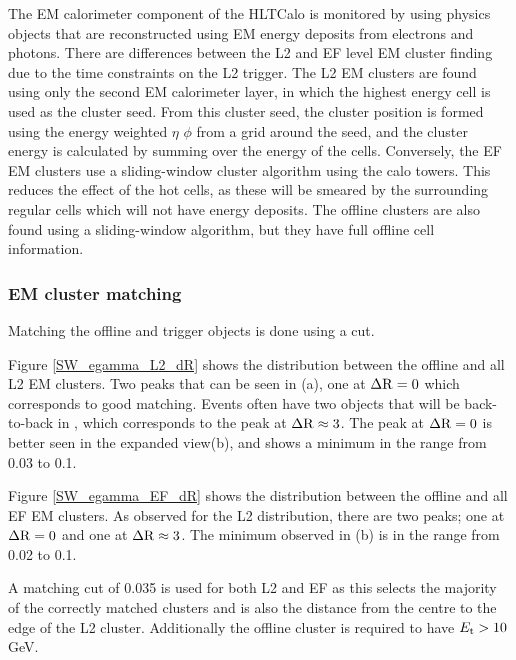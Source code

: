 
The EM calorimeter component of the HLTCalo is monitored by using physics objects that are reconstructed using EM energy deposits from electrons and photons. 
There are differences between the L2 and EF level EM cluster finding due to the time constraints on the L2 trigger.  
The L2 EM clusters are found using only the second EM calorimeter layer, in which the highest energy cell is used as the cluster seed.
From this cluster seed, the cluster position is formed using the energy weighted $\eta$ $\phi$ from a grid  around the seed, and the cluster energy is calculated by summing over the energy of the cells. 
Conversely, the EF EM clusters use a sliding-window cluster algorithm using the calo towers. 
This reduces the effect of the hot cells, as these will be smeared by the surrounding regular cells which will not have energy deposits.
The offline clusters are also found using a sliding-window algorithm, but they have full offline cell information.
 

\subsubsection{EM cluster matching}

Matching the offline and trigger objects is done using a \dr{} cut.

Figure \ref{SW_egamma_L2_dR} shows the \dr{} distribution between the offline and all L2 EM clusters.
Two peaks that can be seen in (a), one at $\mbox{$\Delta{\rm R}$}{}=0$ which corresponds to good matching.
Events often have two objects that will be back-to-back in \dphi{}, which corresponds to the peak at $\mbox{$\Delta{\rm R}$}{}\approx3$. 
The peak at $\mbox{$\Delta{\rm R}$}{}=0$ is better seen in the expanded view(b), and shows a minimum in the range \dr{} from 0.03 to 0.1.

Figure \ref{SW_egamma_EF_dR} shows the \dr{} distribution between the offline and all EF EM clusters.
As observed for the L2 \dr{} distribution, there are two peaks; one at $\mbox{$\Delta{\rm R}$}{}=0$ and one at $\mbox{$\Delta{\rm R}$}{}\approx3$. 
The minimum observed in (b) is in the range \dr{} from 0.02 to 0.1.

A \dr{} matching cut of 0.035 is used for both L2 and EF as this selects the majority of the correctly matched clusters and is also the distance from the centre to the edge of the L2 cluster.
Additionally the offline cluster is required to have $\mbox{$E_{\rm t}$}{}>10$ GeV.  


